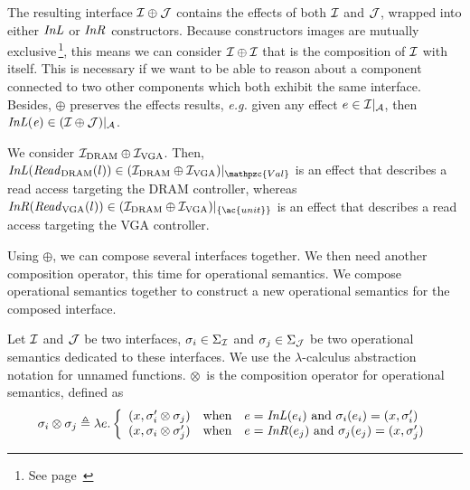 The resulting interface $\mathcal{I} \oplus \mathcal{J}$ contains the effects of both $\mathcal{I}$ and
$\mathcal{J}$, wrapped into either $\mathit{InL}$ or $\mathit{InR}$ constructors.
%
Because constructors images are mutually exclusive\,\footnote{See
  page~\pageref{frontmatter:notations}}, this means we can consider
\( \mathcal{I} \oplus \mathcal{I} \) that is the composition of \( \mathcal{I} \) with itself.
%
This is necessary if we want to be able to reason about a component connected to
two other components which both exhibit the same interface.
%
Besides, \( \oplus \) preserves the effects results, \emph{e.g.} given any
effect \( e \in \mathcal{I}|_{\mathcal{A}} \), then
\( \mathit{InL(e)} \in (\mathcal{I} \oplus \mathcal{J})|_{\mathcal{A}} \).
%

\begin{example}
  We consider $\mathcal{I}_{\mathrm{DRAM}} \oplus \mathcal{I}_{\mathrm{VGA}}$.
  Then,
  $\func{InL}(\func{Read}_{\mathrm{DRAM}}(l)) \in \Interface{(\I_{\mathrm{DRAM}}
    \oplus \I_{\mathrm{VGA}})}{\mathpzc{Val}}$ is an effect that describes a
  read access targeting the DRAM controller, whereas
  $\func{InR}(\func{Read}_{\mathrm{VGA}}(l)) \in \Interface{(\I_{\mathrm{DRAM}}
    \oplus \I_{\mathrm{VGA}})}{\{\ac{unit}\}}$ is an effect that describes a
  read access targeting the VGA controller.
\end{example}

Using $\oplus$, we can compose several interfaces together.
%
We then need another composition operator, this time for operational semantics.
%
We compose operational semantics together to construct a new operational
semantics for the composed interface.

\begin{definition} \label{def:freespec:semantics-composition} Let $\mathcal{I}$ and $\mathcal{J}$ be
  two interfaces, $\sigma_i \in \Sigma_{\mathcal{I}}$ and $\sigma_j \in \Sigma_{\mathcal{J}}$ be
  two operational semantics dedicated to these interfaces.
  We use the $\lambda$-calculus abstraction notation for unnamed functions.
  $\otimes$~is the composition operator for operational semantics, defined as
  \[ \sigma_i \otimes \sigma_j \triangleq \lambda e. \left \{
      \begin{array}{lcl}
        (x, \sigma_i' \otimes \sigma_j) & \text{when} & e =
                                                        \mathit{InL}(e_i)
                                                        \text{ and }
                                                        \sigma_i(e_i)
                                                        = (x,
                                                        \sigma_i') \\
        (x, \sigma_i \otimes \sigma_j') & \text{when} & e =
                                                        \mathit{InR}(e_j)
                                                        \text{ and }
                                                        \sigma_j(e_j)
                                                        = (x, \sigma_j')
      \end{array}
    \right.
  \]
\end{definition}


